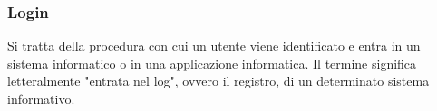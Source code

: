 
\subsubsection*{Login}
Si tratta della procedura con cui un utente viene identificato e entra in un 
sistema informatico o in una applicazione informatica.
Il termine significa letteralmente "entrata nel log", ovvero il registro, di un 
determinato sistema informativo.

\newpage
